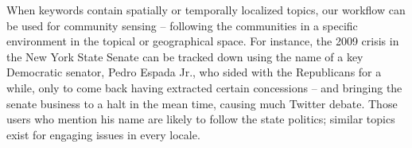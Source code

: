 When keywords contain spatially or temporally localized topics, our workflow can be used for community sensing -- following the communities in a specific environment in the topical or geographical space.  For instance, the 2009 crisis in the New York State Senate can be tracked down using the name of a key Democratic senator, Pedro Espada Jr., who sided with the Republicans for a while, only to come back having extracted certain concessions -- and bringing the senate business to a halt in the mean time, causing much Twitter debate. Those users who mention his name are likely to follow the state politics; similar topics exist for engaging issues in every locale.
